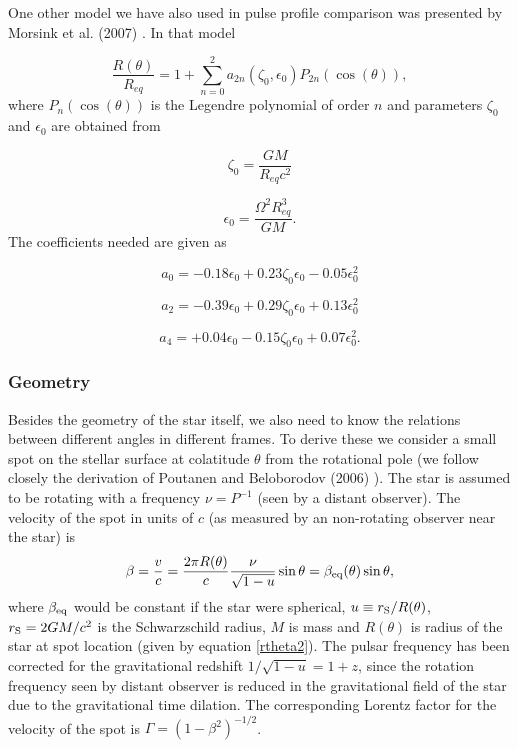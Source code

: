 \documentclass{wihuri}
\def\rg{r_{\rm S}} %
\def\be{\begin{equation}}
\def\ee{\end{equation}}
\def\rg{r_{\rm S}} %
\begin{document}
One other model we have also used in pulse profile comparison was presented by Morsink et al. (2007) \cite{morsink}. In that model


\be\label{eq:rtheta}
\frac{R(\theta)}{R_{eq}} = 1 + \sum\limits_{n=0}^2 a_{2n}(\zeta_{0},\epsilon_{0})P_{2n}(\cos(\theta)), 
\ee
where $P_{n}(\cos(\theta))$ is the Legendre polynomial of order $n$ and parameters $\zeta_{0}$ and $\epsilon_{0}$ are obtained from

\be\label{eq:parzeta}
\zeta_{0} = \frac{GM}{R_{eq}c^{2}}
\ee

\be\label{eq:parepsilon}
\epsilon_{0} = \frac{\Omega^{2}R_{eq}^{3}}{GM}.
\ee
The coefficients needed are given as

\be\label{eq:azero}
a_{0} = -0.18\epsilon_{0}+0.23\zeta_{0}\epsilon_{0}-0.05\epsilon_{0}^{2} 
\ee

\be\label{eq:atwo}
a_{2} = -0.39\epsilon_{0}+0.29\zeta_{0}\epsilon_{0}+0.13\epsilon_{0}^{2}
\ee

\be\label{eq:afour}
a_{4} = +0.04\epsilon_{0}-0.15\zeta_{0}\epsilon_{0}+0.07\epsilon_{0}^{2}.
\ee


\subsubsection{Geometry}

Besides the geometry of the star itself, we also need to know the relations between different angles in different frames. To derive these we consider a small spot on the stellar surface at colatitude $\theta$ from the rotational pole (we follow closely the derivation of Poutanen and Beloborodov (2006) \cite{poutabelo}). 
The star is assumed to be rotating  with a frequency $\nu=P^{-1}$ (seen by a distant observer).
The velocity of the spot in units of $c$ (as measured by an non-rotating observer near the star)  %
is 
\begin{equation}
\label{beta2}
\beta = \frac{v}{c}=\frac{2\pi R(\theta)}{c} \frac{\nu}{\sqrt{1-u}} \sin\theta =\beta_{\rm eq}(\theta) \sin\theta,
\end{equation}
where $\beta_{\rm eq}$ would be constant if the star were spherical, $u\equiv\rg/R(\theta)$, 
$\rg=2GM/c^2$ is the Schwarzschild radius, $M$ is mass and $R(\theta)$ is
radius of the star at spot location (given by equation \ref{rtheta2}). The pulsar frequency has been corrected for the gravitational redshift $1/\sqrt{1-u}=1+z$, since the rotation frequency seen by distant observer is reduced in the gravitational field of the star due to the gravitational time dilation. The corresponding Lorentz factor for the velocity of the spot is $\Gamma=(1-\beta^2)^{-1/2}$.
\end{document}
